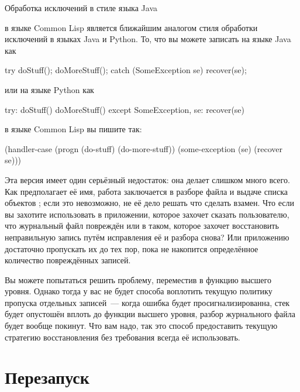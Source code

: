  Обработка исключений в стиле языка Java 

 в языке Common Lisp является ближайшим аналогом стиля обработки
исключений в языках Java и Python. То, что вы можете записать на языке Java как 

\begin{myverb}[language=Java]
try {
  doStuff();
  doMoreStuff();
} catch (SomeException se) {
  recover(se);
}
\end{myverb} 

\noindent{}или на языке Python как 

\begin{myverb}[language=Python]
try:
  doStuff()
  doMoreStuff()
except SomeException, se:
  recover(se)
\end{myverb} 

в языке Common Lisp вы пишите так: 

\begin{myverb}
(handler-case
    (progn
      (do-stuff)
      (do-more-stuff))
  (some-exception (se) (recover se)))
\end{myverb} 


Эта версия  имеет один серьёзный недостаток: она делает слишком много
всего. Как предполагает её имя, работа  заключается в разборе файла и
выдаче списка объектов ; если это невозможно, не её дело решать что
сделать взамен. Что если вы захотите использовать  в приложении,
которое захочет сказать пользователю, что журнальный файл повреждён или в таком, которое
захочет восстановить неправильную запись путём исправления её и разбора снова? Или
приложению достаточно пропускать их до тех пор, пока не накопится определённое количество
повреждённых записей.

Вы можете попытаться решить проблему, переместив  в функцию высшего
уровня. Однако тогда у вас не будет способа воплотить текущую политику пропуска отдельных
записей~--- когда ошибка будет просигнализированна, стек будет опустошён вплоть до функции
высшего уровня, разбор журнального файла будет вообще покинут. Что вам надо, так это
способ предоставить текущую стратегию восстановления без требования всегда её
использовать.

\section{Перезапуск}

